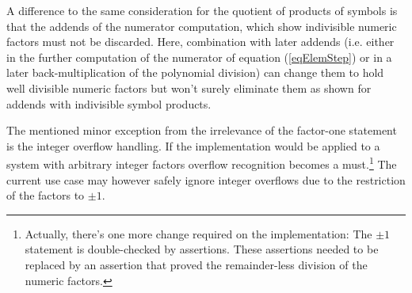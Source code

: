 A difference to the same consideration for the quotient of products of
symbols is that the addends of the numerator computation, which show
indivisible numeric factors must not be discarded. Here, combination with
later addends (i.e. either in the further computation of the numerator of
equation (\ref{eqElemStep}) or in a later back-multiplication of the
polynomial division) can change them to hold well divisible numeric
factors but won't surely eliminate them as shown for addends with
indivisible symbol products.

The mentioned minor exception from the irrelevance of the factor-one
statement is the integer overflow handling. If the implementation would be
applied to a system with arbitrary integer factors overflow recognition
becomes a must.\footnote{Actually, there's one more change required on the
implementation: The $\pm 1$ statement is double-checked by assertions.
These assertions needed to be replaced by an assertion that proved the
remainder-less division of the numeric factors.} The current use case may
however safely ignore integer overflows due to the restriction of the
factors to $\pm 1$.